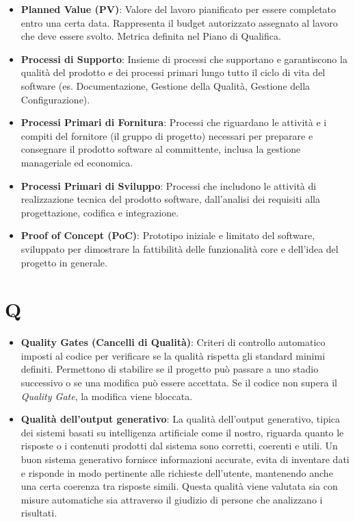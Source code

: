\documentclass[11pt,a4paper]{article}
\begin{document}
\begin{itemize}
\item \textbf{Planned Value (PV)}: Valore del lavoro pianificato per essere completato entro una certa data. Rappresenta il budget autorizzato assegnato al lavoro che deve essere svolto. Metrica definita nel Piano di Qualifica.

\item \textbf{Processi di Supporto}: Insieme di processi che supportano e garantiscono la qualità del prodotto e dei processi primari lungo tutto il ciclo di vita del software (es. Documentazione, Gestione della Qualità, Gestione della Configurazione).

\item \textbf{Processi Primari di Fornitura}: Processi che riguardano le attività e i compiti del fornitore (il gruppo di progetto) necessari per preparare e consegnare il prodotto software al committente, inclusa la gestione manageriale ed economica.

\item \textbf{Processi Primari di Sviluppo}: Processi che includono le attività di realizzazione tecnica del prodotto software, dall'analisi dei requisiti alla progettazione, codifica e integrazione.

\item \textbf{Proof of Concept (PoC)}: Prototipo iniziale e limitato del software, sviluppato per dimostrare la fattibilità delle funzionalità core e dell'idea del progetto in generale.

\end{itemize}
\newpage

\section*{Q}
\begin{itemize}
\item \textbf{Quality Gates (Cancelli di Qualità)}: Criteri di controllo automatico imposti al codice per verificare se la qualità rispetta gli standard minimi definiti. Permettono di stabilire se il progetto può passare a uno stadio successivo o se una modifica può essere accettata. Se il codice non supera il \textit{Quality Gate}, la modifica viene bloccata.

\item \textbf{Qualità dell'output generativo}: La qualità dell’output generativo, tipica dei sistemi basati su intelligenza artificiale come il nostro, riguarda quanto le risposte o i contenuti prodotti dal sistema sono corretti, coerenti e utili. Un buon sistema generativo fornisce informazioni accurate, evita di inventare dati e risponde in modo pertinente alle richieste dell’utente, mantenendo anche una certa coerenza tra risposte simili. Questa qualità viene valutata sia con misure automatiche sia attraverso il giudizio di persone che analizzano i risultati.

\end{itemize}
\end{document}
